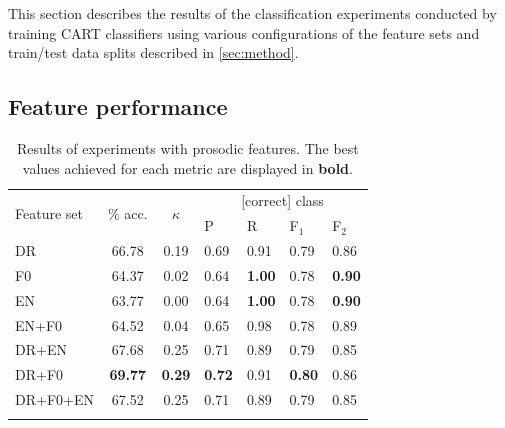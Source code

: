 \documentclass[a4paper]{article}
\begin{document}
	This section describes the results of the classification experiments conducted by training CART classifiers using various configurations of the feature sets and train/test data splits described in \cref{sec:method}. 
	
		\subsection{Feature performance}
		\label{sec:results:features}		
		
		\begin{table}[p]
			\centering
			\caption[Results of experiments with prosodic features]{Results of experiments with prosodic features.%
			The best values achieved for each metric are displayed in \textbf{bold}.
			}
			\begin{tabularx}{\columnwidth}{lccXXXX}			
			
			\toprule
			\multirow{2}{*}{Feature set} & \multirow{2}{*}{\% acc.} & \multirow{2}{*}{$\kappa$} & \multicolumn{4}{c}{[correct] class} \\
			 \cmidrule(lr){4-7}
			& & & P & R & F$_1$ & F$_2$ \\
			\midrule
		
DR	&	66.78	&	0.19	&	0.69	&	0.91	&	0.79	&	0.86	\\
F0		&	64.37	&	0.02	&	0.64	&	\textbf{1.00}	&	0.78	&	\textbf{0.90}	\\
EN		&	63.77	&	0.00	&	0.64	&	\textbf{1.00}	&	0.78	&	\textbf{0.90}	\\
\addlinespace											
EN+F0		&	64.52	&	0.04	&	0.65	&	0.98	&	0.78	&	0.89	\\
DR+EN	&	67.68	&	0.25	&	0.71	&	0.89	&	0.79	&	0.85	\\
DR+F0		&	\textbf{69.77}	&	\textbf{0.29}	&	\textbf{0.72}	&	0.91	&	\textbf{0.80}	&	0.86	\\
\addlinespace											
DR+F0+EN &	67.52	&	0.25	&	0.71	&	0.89	&	0.79	&	0.85	\\		
			\bottomrule
			\label{tab:results:prosody}
			\end{tabularx}
		\end{table}
		
\end{document}
